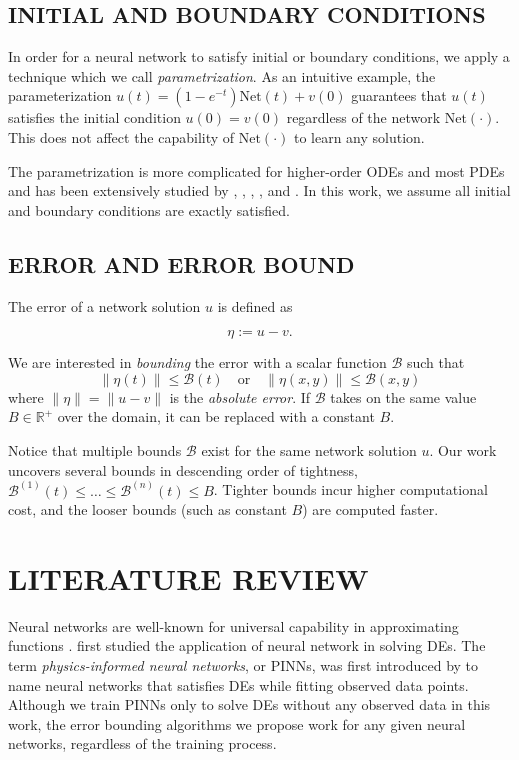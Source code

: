 \documentclass[accepted]{uai2023}
\newcommand{\Err}{\eta}
\newcommand{\Bound}{\mathcal{B}}
\newcommand{\Net}{\mathrm{Net}}
\begin{document}
\subsection{INITIAL AND BOUNDARY CONDITIONS}\label{section:initial-and-boundary-conditions}
    In order for a neural network to satisfy initial or boundary conditions, we apply a technique which we call \textit{parametrization}. 
    As an intuitive example, the parameterization $u(t) = (1 - e^{-t}) \Net(t) + v(0)$ guarantees that $u(t)$ satisfies the initial condition $u(0)=v(0)$ regardless of the network $\Net(\cdot)$.
    This does not affect the capability of $\Net(\cdot)$ to learn any solution.

    The parametrization is more complicated for higher-order ODEs and most PDEs and has been extensively studied by \cite{lagaris1998artificial}, \cite{lagaris2000neural}, \cite{mcfall2009artificial}, \cite{lagari2020systematic}, and \cite{sukumar2021exact}.
    In this work, we assume all initial and boundary conditions are exactly satisfied.

\subsection{ERROR AND ERROR BOUND}
    The error of a network solution $u$ is defined as 
    {
        \small
        \begin{equation}
            \Err := u - v.
        \end{equation}

    }
    We are interested in \textit{bounding} the error with a scalar function $\Bound$ such that 
    {
        \small
        \begin{equation}
            \|\Err(t)\| \leq \Bound(t) \quad \text{or} \quad \|\Err(x, y)\| \leq \Bound(x, y)
        \end{equation}
    }
    where $\|\Err\| = \|u - v\|$ is the \textit{absolute error}.
    If $\Bound$ takes on the same value $B \in \mathbb{R}^{+}$ over the domain, it can be replaced with a constant $B$.

    Notice that multiple bounds $\Bound$ exist for the same network solution $u$.
    Our work uncovers several bounds in descending order of tightness, $\Bound^{(1)}(t) \leq \dots \leq \Bound^{(n)}(t) \leq B$. Tighter bounds incur higher computational cost, and the looser bounds (such as constant $B$) are computed faster.

\section{LITERATURE REVIEW} \label{section:literature-review}
    Neural networks are well-known for universal capability in approximating functions \citep{hornik1989multilayer}. 
    \citeauthor{lagaris1998artificial} first studied the application of neural network in solving DEs.
    The term \textit{physics-informed neural networks}, or PINNs, was first introduced by \citeauthor{raissi2019physics} to name neural networks that satisfies DEs while fitting observed data points. 
    Although we train PINNs only to solve DEs without any observed data in this work, the error bounding algorithms we propose work for any given neural networks, regardless of the training process.
\end{document}

